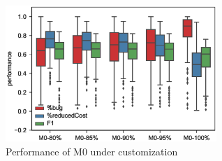 \begin{figure}[t!]
\centering
\includegraphics[width=8cm]{figure/advantageM0.eps}
\caption{Performance of M0 under customization}
\label{fig:advantageM0}
\end{figure}

